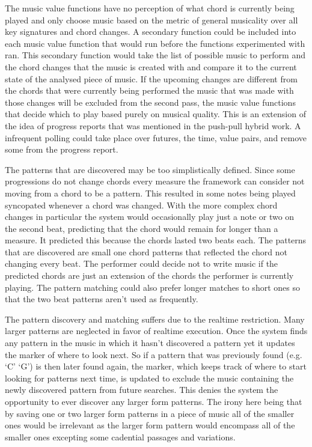 \documentclass[12pt]{ucthesis}
\begin{document}
The music value functions have no perception of what chord is currently being played and only choose music based on the metric of general musicality over all key signatures and chord changes. A secondary function could be included into each music value function that would run before the functions experimented with ran. This secondary function would take the list of possible music to perform and the chord changes that the music is created with and compare it to the current state of the analysed piece of music. If the upcoming changes are different from the chords that were currently being performed the music that was made with those changes will be excluded from the second pass, the music value functions that decide which to play based purely on musical quality. This is an extension of the idea of progress reports that was mentioned in the push-pull hybrid work. A infrequent polling could take place over futures, the time, value pairs, and remove some from the progress report. 

The patterns that are discovered may be too simplistically defined. Since some progressions do not change chords every measure the framework can consider not moving from a chord to be a pattern. This resulted in some notes being played syncopated whenever a chord was changed. With the more complex chord changes in particular the system would occasionally play just a note or two on the second beat, predicting that the chord would remain for longer than a measure. It predicted this because the chords lasted two beats each. The patterns that are discovered are small one chord patterns that reflected the chord not changing every beat. The performer could decide not to write music if the predicted chords are just an extension of the chords the performer is currently playing. The pattern matching could also prefer longer matches to short ones so that the two beat patterns aren't used as frequently.

The pattern discovery and matching suffers due to the realtime restriction. Many larger patterns are neglected in favor of realtime execution. Once the system finds any pattern in the music in which it hasn't discovered a pattern yet it updates the marker of where to look next. So if a pattern that was previously found (e.g. `C' `G') is then later found again, the marker, which keeps track of where to start looking for patterns next time, is updated to exclude the music containing the newly discovered pattern from future searches. This denies the system the opportunity to ever discover any larger form patterns. The irony here being that by saving one or two larger form patterns in a piece of music all of the smaller ones would be irrelevant as the larger form pattern would encompass all of the smaller ones excepting some cadential passages and variations. 
\end{document}

